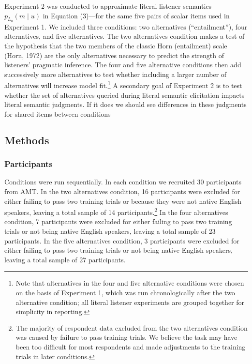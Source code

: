 \documentclass[10pt, letterpaper]{article}
\begin{document}
Experiment 2 was conducted to approximate literal listener
semantics---\(p_{L_0}(m \mid u)\) in Equation (3)---for the same five
pairs of scalar items used in Experiment 1. We included three
conditions: two alternatives (``entailment''), four alternatives, and
five alternatives. The two alternatives condition makes a test of the
hypothesis that the two members of the classic Horn (entailment) scale
(Horn, 1972) are the only alternatives necessary to predict the strength
of listeners' pragmatic inference. The four and five alternative
conditions then add successively more alternatives to test whether
including a larger number of alternatives will increase model
fit.\footnote{Note that alternatives in the four and five alternative conditions were chosen on the basis of Experiment 1, which was run chronologically after the two alternative condition; all literal listener experiments are grouped together for simplicity in reporting.}
A secondary goal of Experiment 2 is to test whether the set of
alternatives queried during literal semantic elicitation impacts literal
semantic judgments. If it does we should see differences in these
judgments for shared items between conditions

\subsection{Methods}\label{methods-1}

\subsubsection{Participants}\label{participants-1}

Conditions were run sequentially. In each condition we recruited 30
participants from AMT. In the two alternatives condition, 16
participants were excluded for either failing to pass two training
trials or because they were not native English speakers, leaving a total
sample of 14
participants.\footnote{The majority of respondent data excluded from the two alternatives condition was caused by failure to pass training trials. We believe the task may have been too difficult for most respondents and made adjustments to the training trials in later conditions.}
In the four alternatives condition, 7 participants were excluded for
either failing to pass two training trials or not being native English
speakers, leaving a total sample of 23 participants. In the five
alternatives condition, 3 participants were excluded for either failing
to pass two training trials or not being native English speakers,
leaving a total sample of 27 participants.
\end{document}
